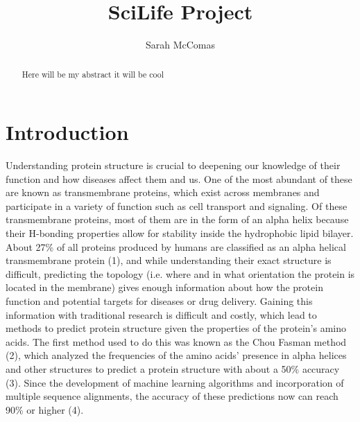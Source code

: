 \documentclass[final]{article}
\begin{document}
\title{SciLife Project}
\author{Sarah McComas}
\maketitle

\clearpage


\begin{abstract}
Here will be my abstract it will be cool
\end{abstract}




\section{Introduction} 

Understanding protein structure is crucial to deepening our knowledge of their function and how diseases affect them and us. One of the most abundant of these are known as transmembrane proteins, which exist across membranes and participate in a variety of function such as cell transport and signaling. Of these transmembrane proteins, most of them are in the form of an alpha helix because their H-bonding properties allow for stability inside the hydrophobic lipid bilayer. About 27\% of all proteins produced by humans are classified as an alpha helical transmembrane protein (1), and while understanding their exact structure is difficult, predicting the topology (i.e. where and in what orientation the protein is located in the membrane) gives enough information about how the protein function and potential targets for diseases or drug delivery. Gaining this information with traditional research is difficult and costly, which lead to methods to predict protein structure given the properties of the protein's amino acids. The first method used to do this was known as the Chou Fasman method (2), which analyzed the frequencies of the amino acids' presence in alpha helices and other structures to predict a protein structure with about a 50\% accuracy (3). Since the development of machine learning algorithms and incorporation of multiple sequence alignments, the accuracy of these predictions now can reach 90\% or higher (4). 
\end{document}
